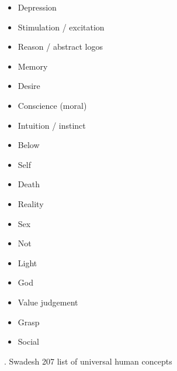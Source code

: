 \begin{multicols}{2}
\begin{itemize}
\item   Depression 

\item   Stimulation / excitation 

\item   Reason / abstract logos  

\item   Memory 

\item   Desire 

\item   Conscience (moral) 

\item   Intuition / instinct 

\item   Below 

\item   Self 

\item   Death 

\item   Reality 

\item   Sex 

\item   Not 

\item   Light 

\item   God 

\item   Value judgement  

\item   Grasp 

\item   Social  
\end{itemize}
\end{multicols}

. Swadesh 207 list of universal human concepts 

